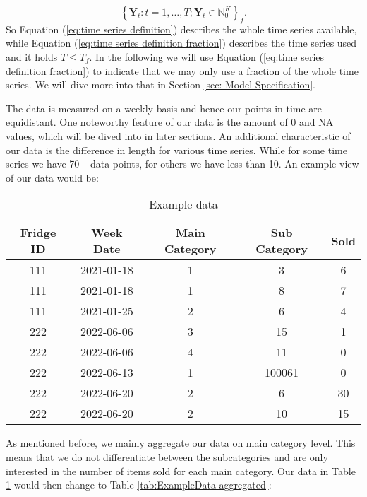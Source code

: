 \begin{equation}
\left\{\bm{Y}_t:t=1,\ldots,T; \bm{Y}_t \in \mathbb{N}_0^K \right\}_f.
\label{eq:time series definition fraction}
\end{equation}
%
So Equation (\ref{eq:time series definition}) describes the whole time series available, while Equation (\ref{eq:time series definition fraction}) describes the time series used and it holds $T\leq T_f$. In the following we will use Equation (\ref{eq:time series definition fraction}) to indicate that we may only use a fraction of the whole time series. We will dive more into that in Section \ref{sec: Model Specification}.

The data is measured on a weekly basis and hence our points in time are equidistant. One noteworthy feature of our data is the amount of 0 and NA values, which will be dived into in later sections. An additional characteristic of our data is the difference in length for various time series. While for some time series we have 70+ data points, for others we have less than 10. An example view of our data would be: 

\begin{table}[h!]
\centering
\begin{tabular}{ccccc}
\hline
\rowcolor[HTML]{FFFFFF} 
\textbf{Fridge ID} & \textbf{Week Date} & \textbf{Main Category} & \textbf{Sub Category} & \textbf{Sold} \\ \hline
111                & 2021-01-18         & 1                      & 3                     & 6             \\
111                & 2021-01-18         & 1                      & 8                     & 7             \\
111                & 2021-01-25         & 2                      & 6                     & 4             \\
222                & 2022-06-06         & 3                      & 15                    & 1             \\
222                & 2022-06-06         & 4                      & 11                    & 0             \\
222                & 2022-06-13         & 1                      & 100061                & 0             \\
222                & 2022-06-20         & 2                      & 6                     & 30            \\
222                & 2022-06-20         & 2                      & 10                    & 15            \\ \hline
\end{tabular}
\caption{Example data}
\label{tab:ExampleData}
\end{table}
%
As mentioned before, we mainly aggregate our data on main category level. This means that we do not differentiate between the subcategories and are only interested in the number of items sold for each main category. Our data in Table \ref{tab:ExampleData} would then change to Table \ref{tab:ExampleData aggregated}:

